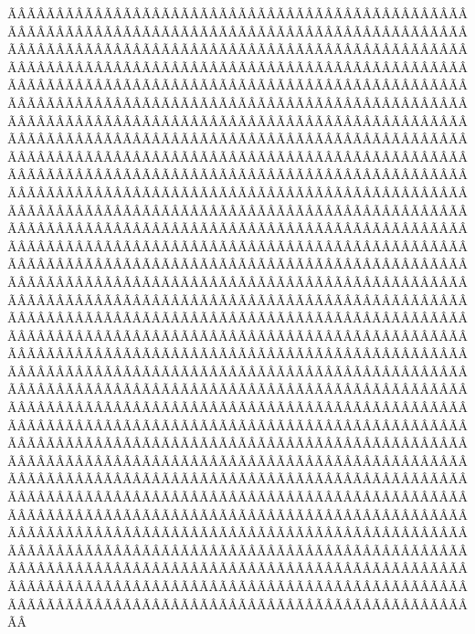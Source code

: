 \begin{sumilla}
\begin{objetivosdelcurso}
\begin{objetivosdelcurso}
ÃÂÃÂÃÂÃÂÃÂÃÂÃÂÃÂÃÂÃÂÃÂÃÂÃÂÃÂÃÂÃÂÃÂÃÂÃÂÃÂÃÂÃÂÃÂÃÂÃÂÃÂÃÂÃÂÃÂÃÂÃÂÃÂÃÂÃÂÃÂÃÂÃÂÃÂÃÂÃÂÃÂÃÂÃÂÃÂÃÂÃÂÃÂÃÂÃÂÃÂÃÂÃÂÃÂÃÂÃÂÃÂÃÂÃÂÃÂÃÂÃÂÃÂÃÂÃÂÃÂÃÂÃÂÃÂÃÂÃÂÃÂÃÂÃÂÃÂÃÂÃÂÃÂÃÂÃÂÃÂÃÂÃÂÃÂÃÂÃÂÃÂÃÂÃÂÃÂÃÂÃÂÃÂÃÂÃÂÃÂÃÂÃÂÃÂÃÂÃÂÃÂÃÂÃÂÃÂÃÂÃÂÃÂÃÂÃÂÃÂÃÂÃÂÃÂÃÂÃÂÃÂÃÂÃÂÃÂÃÂÃÂÃÂÃÂÃÂÃÂÃÂÃÂÃÂÃÂÃÂÃÂÃÂÃÂÃÂÃÂÃÂÃÂÃÂÃÂÃÂÃÂÃÂÃÂÃÂÃÂÃÂÃÂÃÂÃÂÃÂÃÂÃÂÃÂÃÂÃÂÃÂÃÂÃÂÃÂÃÂÃÂÃÂÃÂÃÂÃÂÃÂÃÂÃÂÃÂÃÂÃÂÃÂÃÂÃÂÃÂÃÂÃÂÃÂÃÂÃÂÃÂÃÂÃÂÃÂÃÂÃÂÃÂÃÂÃÂÃÂÃÂÃÂÃÂÃÂÃÂÃÂÃÂÃÂÃÂÃÂÃÂÃÂÃÂÃÂÃÂÃÂÃÂÃÂÃÂÃÂÃÂÃÂÃÂÃÂÃÂÃÂÃÂÃÂÃÂÃÂÃÂÃÂÃÂÃÂÃÂÃÂÃÂÃÂÃÂÃÂÃÂÃÂÃÂÃÂÃÂÃÂÃÂÃÂÃÂÃÂÃÂÃÂÃÂÃÂÃÂÃÂÃÂÃÂÃÂÃÂÃÂÃÂÃÂÃÂÃÂÃÂÃÂÃÂÃÂÃÂÃÂÃÂÃÂÃÂÃÂÃÂÃÂÃÂÃÂÃÂÃÂÃÂÃÂÃÂÃÂÃÂÃÂÃÂÃÂÃÂÃÂÃÂÃÂÃÂÃÂÃÂÃÂÃÂÃÂÃÂÃÂÃÂÃÂÃÂÃÂÃÂÃÂÃÂÃÂÃÂÃÂÃÂÃÂÃÂÃÂÃÂÃÂÃÂÃÂÃÂÃÂÃÂÃÂÃÂÃÂÃÂÃÂÃÂÃÂÃÂÃÂÃÂÃÂÃÂÃÂÃÂÃÂÃÂÃÂÃÂÃÂÃÂÃÂÃÂÃÂÃÂÃÂÃÂÃÂÃÂÃÂÃÂÃÂÃÂÃÂÃÂÃÂÃÂÃÂÃÂÃÂÃÂÃÂÃÂÃÂÃÂÃÂÃÂÃÂÃÂÃÂÃÂÃÂÃÂÃÂÃÂÃÂÃÂÃÂÃÂÃÂÃÂÃÂÃÂÃÂÃÂÃÂÃÂÃÂÃÂÃÂÃÂÃÂÃÂÃÂÃÂÃÂÃÂÃÂÃÂÃÂÃÂÃÂÃÂÃÂÃÂÃÂÃÂÃÂÃÂÃÂÃÂÃÂÃÂÃÂÃÂÃÂÃÂÃÂÃÂÃÂÃÂÃÂÃÂÃÂÃÂÃÂÃÂÃÂÃÂÃÂÃÂÃÂÃÂÃÂÃÂÃÂÃÂÃÂÃÂÃÂÃÂÃÂÃÂÃÂÃÂÃÂÃÂÃÂÃÂÃÂÃÂÃÂÃÂÃÂÃÂÃÂÃÂÃÂÃÂÃÂÃÂÃÂÃÂÃÂÃÂÃÂÃÂÃÂÃÂÃÂÃÂÃÂÃÂÃÂÃÂÃÂÃÂÃÂÃÂÃÂÃÂÃÂÃÂÃÂÃÂÃÂÃÂÃÂÃÂÃÂÃÂÃÂÃÂÃÂÃÂÃÂÃÂÃÂÃÂÃÂÃÂÃÂÃÂÃÂÃÂÃÂÃÂÃÂÃÂÃÂÃÂÃÂÃÂÃÂÃÂÃÂÃÂÃÂÃÂÃÂÃÂÃÂÃÂÃÂÃÂÃÂÃÂÃÂÃÂÃÂÃÂÃÂÃÂÃÂÃÂÃÂÃÂÃÂÃÂÃÂÃÂÃÂÃÂÃÂÃÂÃÂÃÂÃÂÃÂÃÂÃÂÃÂÃÂÃÂÃÂÃÂÃÂÃÂÃÂÃÂÃÂÃÂÃÂÃÂÃÂÃÂÃÂÃÂÃÂÃÂÃÂÃÂÃÂÃÂÃÂÃÂÃÂÃÂÃÂÃÂÃÂÃÂÃÂÃÂÃÂÃÂÃÂÃÂÃÂÃÂÃÂÃÂÃÂÃÂÃÂÃÂÃÂÃÂÃÂÃÂÃÂÃÂÃÂÃÂÃÂÃÂÃÂÃÂÃÂÃÂÃÂÃÂÃÂÃÂÃÂÃÂÃÂÃÂÃÂÃÂÃÂÃÂÃÂÃÂÃÂÃÂÃÂÃÂÃÂÃÂÃÂÃÂÃÂÃÂÃÂÃÂÃÂÃÂÃÂÃÂÃÂÃÂÃÂÃÂÃÂÃÂÃÂÃÂÃÂÃÂÃÂÃÂÃÂÃÂÃÂÃÂÃÂÃÂÃÂÃÂÃÂÃÂÃÂÃÂÃÂÃÂÃÂÃÂÃÂÃÂÃÂÃÂÃÂÃÂÃÂÃÂÃÂÃÂÃÂÃÂÃÂÃÂÃÂÃÂÃÂÃÂÃÂÃÂÃÂÃÂÃÂÃÂÃÂÃÂÃÂÃÂÃÂÃÂÃÂÃÂÃÂÃÂÃÂÃÂÃÂÃÂÃÂÃÂÃÂÃÂÃÂÃÂÃÂÃÂÃÂÃÂÃÂÃÂÃÂÃÂÃÂÃÂÃÂÃÂÃÂÃÂÃÂÃÂÃÂÃÂÃÂÃÂÃÂÃÂÃÂÃÂÃÂÃÂÃÂÃÂÃÂÃÂÃÂÃÂÃÂÃÂÃÂÃÂÃÂÃÂÃÂÃÂÃÂÃÂÃÂÃÂÃÂÃÂÃÂÃÂÃÂÃÂÃÂÃÂÃÂÃÂÃÂÃÂÃÂÃÂÃÂÃÂÃÂÃÂÃÂÃÂÃÂÃÂÃÂÃÂÃÂÃÂÃÂÃÂÃÂÃÂÃÂÃÂÃÂÃÂÃÂÃÂÃÂÃÂÃÂÃÂÃÂÃÂÃÂÃÂÃÂÃÂÃÂÃÂÃÂÃÂÃÂÃÂÃÂÃÂÃÂÃÂÃÂÃÂÃÂÃÂÃÂÃÂÃÂÃÂÃÂÃÂÃÂÃÂÃÂÃÂ
\end{objetivosdelcurso}
\end{objetivosdelcurso}
\end{sumilla}
